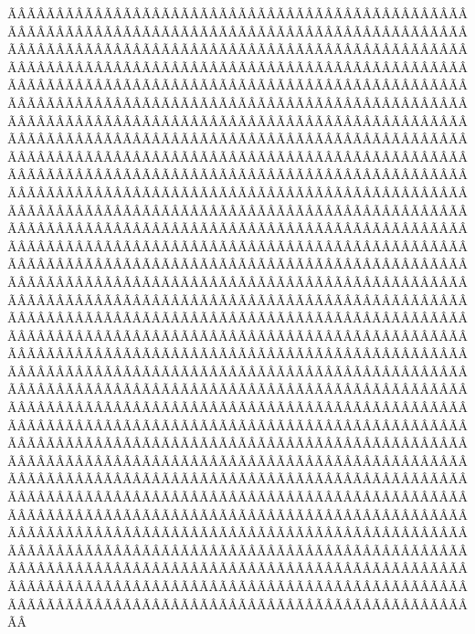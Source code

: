 \begin{sumilla}
\begin{objetivosdelcurso}
\begin{objetivosdelcurso}
ÃÂÃÂÃÂÃÂÃÂÃÂÃÂÃÂÃÂÃÂÃÂÃÂÃÂÃÂÃÂÃÂÃÂÃÂÃÂÃÂÃÂÃÂÃÂÃÂÃÂÃÂÃÂÃÂÃÂÃÂÃÂÃÂÃÂÃÂÃÂÃÂÃÂÃÂÃÂÃÂÃÂÃÂÃÂÃÂÃÂÃÂÃÂÃÂÃÂÃÂÃÂÃÂÃÂÃÂÃÂÃÂÃÂÃÂÃÂÃÂÃÂÃÂÃÂÃÂÃÂÃÂÃÂÃÂÃÂÃÂÃÂÃÂÃÂÃÂÃÂÃÂÃÂÃÂÃÂÃÂÃÂÃÂÃÂÃÂÃÂÃÂÃÂÃÂÃÂÃÂÃÂÃÂÃÂÃÂÃÂÃÂÃÂÃÂÃÂÃÂÃÂÃÂÃÂÃÂÃÂÃÂÃÂÃÂÃÂÃÂÃÂÃÂÃÂÃÂÃÂÃÂÃÂÃÂÃÂÃÂÃÂÃÂÃÂÃÂÃÂÃÂÃÂÃÂÃÂÃÂÃÂÃÂÃÂÃÂÃÂÃÂÃÂÃÂÃÂÃÂÃÂÃÂÃÂÃÂÃÂÃÂÃÂÃÂÃÂÃÂÃÂÃÂÃÂÃÂÃÂÃÂÃÂÃÂÃÂÃÂÃÂÃÂÃÂÃÂÃÂÃÂÃÂÃÂÃÂÃÂÃÂÃÂÃÂÃÂÃÂÃÂÃÂÃÂÃÂÃÂÃÂÃÂÃÂÃÂÃÂÃÂÃÂÃÂÃÂÃÂÃÂÃÂÃÂÃÂÃÂÃÂÃÂÃÂÃÂÃÂÃÂÃÂÃÂÃÂÃÂÃÂÃÂÃÂÃÂÃÂÃÂÃÂÃÂÃÂÃÂÃÂÃÂÃÂÃÂÃÂÃÂÃÂÃÂÃÂÃÂÃÂÃÂÃÂÃÂÃÂÃÂÃÂÃÂÃÂÃÂÃÂÃÂÃÂÃÂÃÂÃÂÃÂÃÂÃÂÃÂÃÂÃÂÃÂÃÂÃÂÃÂÃÂÃÂÃÂÃÂÃÂÃÂÃÂÃÂÃÂÃÂÃÂÃÂÃÂÃÂÃÂÃÂÃÂÃÂÃÂÃÂÃÂÃÂÃÂÃÂÃÂÃÂÃÂÃÂÃÂÃÂÃÂÃÂÃÂÃÂÃÂÃÂÃÂÃÂÃÂÃÂÃÂÃÂÃÂÃÂÃÂÃÂÃÂÃÂÃÂÃÂÃÂÃÂÃÂÃÂÃÂÃÂÃÂÃÂÃÂÃÂÃÂÃÂÃÂÃÂÃÂÃÂÃÂÃÂÃÂÃÂÃÂÃÂÃÂÃÂÃÂÃÂÃÂÃÂÃÂÃÂÃÂÃÂÃÂÃÂÃÂÃÂÃÂÃÂÃÂÃÂÃÂÃÂÃÂÃÂÃÂÃÂÃÂÃÂÃÂÃÂÃÂÃÂÃÂÃÂÃÂÃÂÃÂÃÂÃÂÃÂÃÂÃÂÃÂÃÂÃÂÃÂÃÂÃÂÃÂÃÂÃÂÃÂÃÂÃÂÃÂÃÂÃÂÃÂÃÂÃÂÃÂÃÂÃÂÃÂÃÂÃÂÃÂÃÂÃÂÃÂÃÂÃÂÃÂÃÂÃÂÃÂÃÂÃÂÃÂÃÂÃÂÃÂÃÂÃÂÃÂÃÂÃÂÃÂÃÂÃÂÃÂÃÂÃÂÃÂÃÂÃÂÃÂÃÂÃÂÃÂÃÂÃÂÃÂÃÂÃÂÃÂÃÂÃÂÃÂÃÂÃÂÃÂÃÂÃÂÃÂÃÂÃÂÃÂÃÂÃÂÃÂÃÂÃÂÃÂÃÂÃÂÃÂÃÂÃÂÃÂÃÂÃÂÃÂÃÂÃÂÃÂÃÂÃÂÃÂÃÂÃÂÃÂÃÂÃÂÃÂÃÂÃÂÃÂÃÂÃÂÃÂÃÂÃÂÃÂÃÂÃÂÃÂÃÂÃÂÃÂÃÂÃÂÃÂÃÂÃÂÃÂÃÂÃÂÃÂÃÂÃÂÃÂÃÂÃÂÃÂÃÂÃÂÃÂÃÂÃÂÃÂÃÂÃÂÃÂÃÂÃÂÃÂÃÂÃÂÃÂÃÂÃÂÃÂÃÂÃÂÃÂÃÂÃÂÃÂÃÂÃÂÃÂÃÂÃÂÃÂÃÂÃÂÃÂÃÂÃÂÃÂÃÂÃÂÃÂÃÂÃÂÃÂÃÂÃÂÃÂÃÂÃÂÃÂÃÂÃÂÃÂÃÂÃÂÃÂÃÂÃÂÃÂÃÂÃÂÃÂÃÂÃÂÃÂÃÂÃÂÃÂÃÂÃÂÃÂÃÂÃÂÃÂÃÂÃÂÃÂÃÂÃÂÃÂÃÂÃÂÃÂÃÂÃÂÃÂÃÂÃÂÃÂÃÂÃÂÃÂÃÂÃÂÃÂÃÂÃÂÃÂÃÂÃÂÃÂÃÂÃÂÃÂÃÂÃÂÃÂÃÂÃÂÃÂÃÂÃÂÃÂÃÂÃÂÃÂÃÂÃÂÃÂÃÂÃÂÃÂÃÂÃÂÃÂÃÂÃÂÃÂÃÂÃÂÃÂÃÂÃÂÃÂÃÂÃÂÃÂÃÂÃÂÃÂÃÂÃÂÃÂÃÂÃÂÃÂÃÂÃÂÃÂÃÂÃÂÃÂÃÂÃÂÃÂÃÂÃÂÃÂÃÂÃÂÃÂÃÂÃÂÃÂÃÂÃÂÃÂÃÂÃÂÃÂÃÂÃÂÃÂÃÂÃÂÃÂÃÂÃÂÃÂÃÂÃÂÃÂÃÂÃÂÃÂÃÂÃÂÃÂÃÂÃÂÃÂÃÂÃÂÃÂÃÂÃÂÃÂÃÂÃÂÃÂÃÂÃÂÃÂÃÂÃÂÃÂÃÂÃÂÃÂÃÂÃÂÃÂÃÂÃÂÃÂÃÂÃÂÃÂÃÂÃÂÃÂÃÂÃÂÃÂÃÂÃÂÃÂÃÂÃÂÃÂÃÂÃÂÃÂÃÂÃÂÃÂÃÂÃÂÃÂÃÂÃÂÃÂÃÂÃÂÃÂÃÂÃÂÃÂÃÂÃÂÃÂÃÂÃÂÃÂÃÂÃÂÃÂÃÂÃÂÃÂÃÂÃÂÃÂÃÂÃÂÃÂÃÂÃÂÃÂÃÂÃÂÃÂÃÂÃÂÃÂÃÂÃÂÃÂÃÂÃÂÃÂÃÂÃÂÃÂÃÂÃÂÃÂÃÂÃÂÃÂÃÂÃÂÃÂÃÂÃÂÃÂÃÂÃÂÃÂÃÂÃÂÃÂÃÂÃÂÃÂÃÂÃÂÃÂÃÂÃÂÃÂÃÂÃÂÃÂÃÂÃÂÃÂÃÂÃÂÃÂÃÂÃÂÃÂ
\end{objetivosdelcurso}
\end{objetivosdelcurso}
\end{sumilla}
